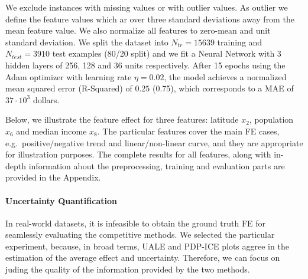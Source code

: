 \documentclass[twoside]{article}
\begin{document}
We exclude instances with missing values or with outlier values. As
outlier we define the feature values which ar over three standard
deviations away from the mean feature value. We also normalize all
features to zero-mean and unit standard deviation. We split the
dataset into \(N_{tr} = 15639\) training and \(N_{test} = 3910\) test
examples (80/20 split) and we fit a Neural Network with 3 hidden
layers of 256, 128 and 36 units respectively. After 15 epochs using
the Adam optimizer with learning rate \(\eta = 0.02\), the model
achieves a normalized mean squared error (R-Squared) of \(0.25\)
(0.75), which corresponds to a MAE of \(37 \cdot 10^3\) dollars. 

Below, we illustrate the feature effect for three features: latitude
\(x_2\), population \(x_6\) and median income \(x_8\). The particular
features cover the main FE cases, e.g.~positive/negative trend and
linear/non-linear curve, and they are appropriate for illustration
purposes. The complete results for all features, along with in-depth
information about the preprocessing, training and evaluation parts are
provided in the Appendix.

\paragraph{Uncertainty Quantification}

In real-world datasets, it is infeasible to obtain the ground truth FE
for seamlessly evaluating the competitive methods. We selected the
particular experiment, because, in broad terms, UALE and PDP-ICE plots
aggree in the estimation of the average effect and
uncertainty. Therefore, we can focus on juding the quality of the
information provided by the two methods.
\end{document}
